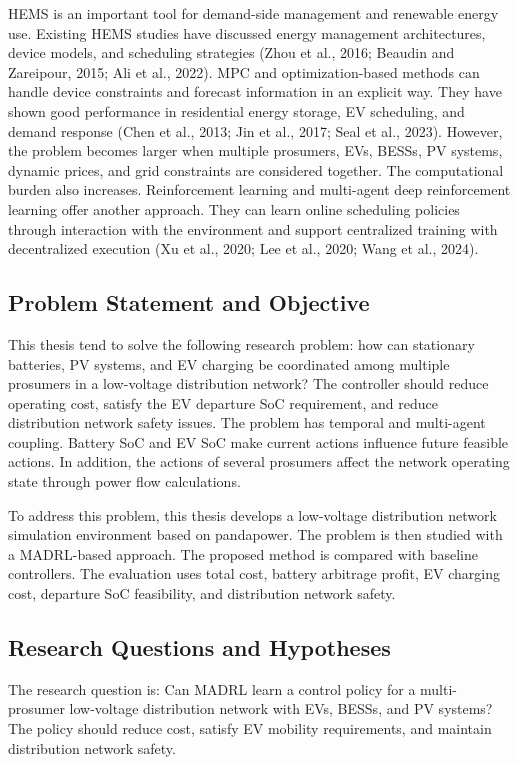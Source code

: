 \documentclass[12pt,a4paper]{ctexart}
\begin{document}
HEMS is an important tool for demand-side management and renewable energy use. Existing HEMS studies have discussed energy management architectures, device models, and scheduling strategies (Zhou et al., 2016; Beaudin and Zareipour, 2015; Ali et al., 2022). MPC and optimization-based methods can handle device constraints and forecast information in an explicit way. They have shown good performance in residential energy storage, EV scheduling, and demand response (Chen et al., 2013; Jin et al., 2017; Seal et al., 2023). However, the problem becomes larger when multiple prosumers, EVs, BESSs, PV systems, dynamic prices, and grid constraints are considered together. The computational burden also increases. Reinforcement learning and multi-agent deep reinforcement learning offer another approach. They can learn online scheduling policies through interaction with the environment and support centralized training with decentralized execution (Xu et al., 2020; Lee et al., 2020; Wang et al., 2024).

\subsection{Problem Statement and Objective}

This thesis tend to solve the following research problem: how can stationary batteries, PV systems, and EV charging be coordinated among multiple prosumers in a low-voltage distribution network? The controller should reduce operating cost, satisfy the EV departure SoC requirement, and reduce distribution network safety issues. The problem has temporal and multi-agent coupling. Battery SoC and EV SoC make current actions influence future feasible actions. In addition, the actions of several prosumers affect the network operating state through power flow calculations.

To address this problem, this thesis develops a low-voltage distribution network simulation environment based on pandapower. The problem is then studied with a MADRL-based approach. The proposed method is compared with baseline controllers. The evaluation uses total cost, battery arbitrage profit, EV charging cost, departure SoC feasibility, and distribution network safety.

\subsection{Research Questions and Hypotheses}

The research question is: Can MADRL learn a control policy for a multi-prosumer low-voltage distribution network with EVs, BESSs, and PV systems? The policy should reduce cost, satisfy EV mobility requirements, and maintain distribution network safety.
\end{document}
